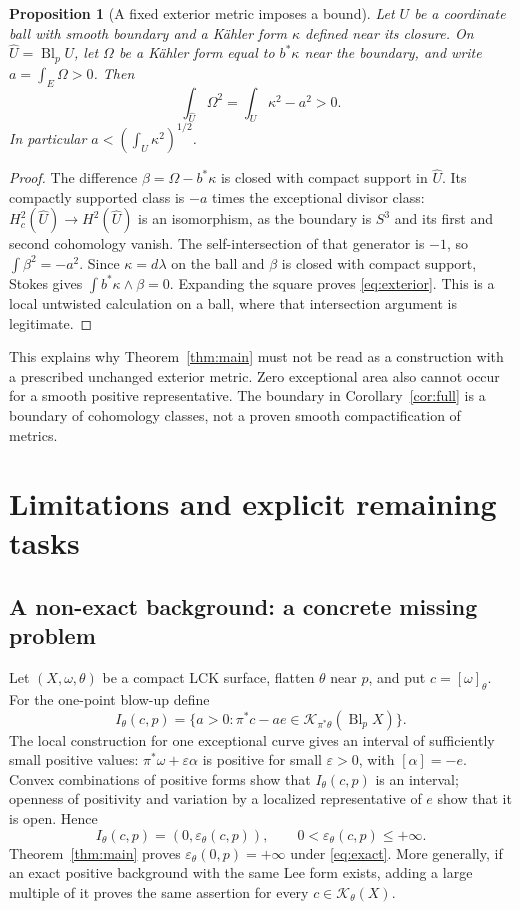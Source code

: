 \documentclass[12pt]{amsart}
\newtheorem{prop}[thm]{Proposition}
\theoremstyle{definition}
\theoremstyle{remark}
\numberwithin{equation}{section}
\newcommand{\cK}{\mathcal{K}}
\begin{document}
\begin{prop}[A fixed exterior metric imposes a bound]\label{prop:exterior}
Let $U$ be a coordinate ball with smooth boundary and a K\"ahler form $\kappa$ defined near its closure. On $\widehat U=\operatorname{Bl}_pU$, let $\Omega$ be a K\"ahler form equal to $b^*\kappa$ near the boundary, and write $a=\int_E\Omega>0$. Then
\begin{equation}\label{eq:exterior}
 \int_{\widehat U}\Omega^2=\int_U\kappa^2-a^2>0.
\end{equation}
In particular $a<(\int_U\kappa^2)^{1/2}$.
\end{prop}
\begin{proof}
The difference $\beta=\Omega-b^*\kappa$ is closed with compact support in $\widehat U$. Its compactly supported class is $-a$ times the exceptional divisor class: $H_c^2(\widehat U)\to H^2(\widehat U)$ is an isomorphism, as the boundary is $S^3$ and its first and second cohomology vanish. The self-intersection of that generator is $-1$, so $\int\beta^2=-a^2$. Since $\kappa=d\lambda$ on the ball and $\beta$ is closed with compact support, Stokes gives $\int b^*\kappa\wedge\beta=0$. Expanding the square proves \eqref{eq:exterior}. This is a local untwisted calculation on a ball, where that intersection argument is legitimate.
\end{proof}
This explains why Theorem~\ref{thm:main} must not be read as a construction with a prescribed unchanged exterior metric. Zero exceptional area also cannot occur for a smooth positive representative. The boundary in Corollary~\ref{cor:full} is a boundary of cohomology classes, not a proven smooth compactification of metrics.

\section{Limitations and explicit remaining tasks}\label{sec:limits}
\subsection{A non-exact background: a concrete missing problem}
Let $(X,\omega,\theta)$ be a compact LCK surface, flatten $\theta$ near $p$, and put $c=[\omega]_\theta$. For the one-point blow-up define
\begin{equation}\label{eq:epsilon}
 I_\theta(c,p)=\{a>0:\pi^*c-ae\in\cK_{\pi^*\theta}(\operatorname{Bl}_pX)\}.
\end{equation}
The local construction for one exceptional curve gives an interval of sufficiently small positive values: $\pi^*\omega+\varepsilon\alpha$ is positive for small $\varepsilon>0$, with $[\alpha]=-e$. Convex combinations of positive forms show that $I_\theta(c,p)$ is an interval; openness of positivity and variation by a localized representative of $e$ show that it is open. Hence
\[
 I_\theta(c,p)=(0,\varepsilon_\theta(c,p)),\qquad
 0<\varepsilon_\theta(c,p)\leq+\infty.
\]
Theorem~\ref{thm:main} proves $\varepsilon_\theta(0,p)=+\infty$ under \eqref{eq:exact}. More generally, if an exact positive background with the same Lee form exists, adding a large multiple of it proves the same assertion for every $c\in\cK_\theta(X)$.
\end{document}
